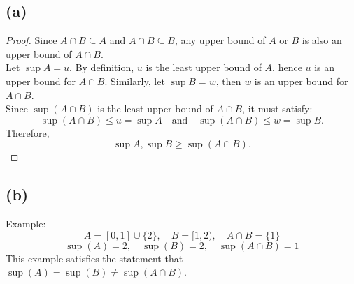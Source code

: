 \documentclass{article}
\begin{document}
\subsection*{(a)}
\begin{proof}
    Since \( A \cap B \subseteq A \) and \( A \cap B \subseteq B \), any upper bound of \( A \) or \( B \) is also an upper bound of \( A \cap B \).
    \\
    Let \( \sup A = u \). By definition, \( u \) is the least upper bound of \( A \), hence \( u \) is an upper bound for \( A \cap B \).
    Similarly, let \( \sup B = w \), then \( w \) is an upper bound for \( A \cap B \).
    \\
    Since \( \sup(A \cap B) \) is the least upper bound of \( A \cap B \), it must satisfy:
    \[ \sup(A \cap B) \leq u = \sup A \quad \text{and} \quad \sup(A \cap B) \leq w = \sup B. \]
    Therefore,
    \[ \sup A, \sup B \geq \sup(A \cap B). \]
\end{proof}

\subsection*{(b)}
Example:
\[ A = [0, 1] \cup \{2\}, \quad B = [1, 2), \quad A \cap B = \{1\} \]
\[ \sup(A) = 2, \quad \sup(B) = 2, \quad \sup(A \cap B) = 1 \]
This example satisfies the statement that \( \sup(A) = \sup(B) \neq \sup(A \cap B) \).
\end{document}
